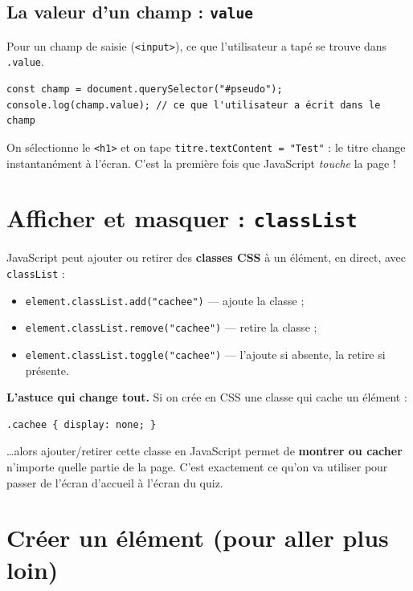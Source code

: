 \documentclass[11pt,a4paper]{article}
\newcommand{\code}[1]{\texttt{#1}}
\begin{document}
\subsection{La valeur d'un champ : \texttt{value}}
Pour un champ de saisie (\code{<input>}), ce que l'utilisateur a tapé se trouve dans \code{.value}.

\begin{lstlisting}[style=js]
const champ = document.querySelector("#pseudo");
console.log(champ.value); // ce que l'utilisateur a écrit dans le champ
\end{lstlisting}

\begin{infobox}
On sélectionne le \code{<h1>} et on tape \code{titre.textContent = "Test"} : le titre change instantanément à l'écran. C'est la première fois que JavaScript \emph{touche} la page !
\end{infobox}

\section{Afficher et masquer : \texttt{classList}}

JavaScript peut ajouter ou retirer des \textbf{classes CSS} à un élément, en direct, avec \code{classList} :
\begin{itemize}[leftmargin=*,noitemsep]
  \item \code{element.classList.add("cachee")} --- ajoute la classe ;
  \item \code{element.classList.remove("cachee")} --- retire la classe ;
  \item \code{element.classList.toggle("cachee")} --- l'ajoute si absente, la retire si présente.
\end{itemize}

\textbf{L'astuce qui change tout.} Si on crée en CSS une classe qui cache un élément :
\begin{lstlisting}[style=html]
.cachee { display: none; }
\end{lstlisting}
\ldots alors ajouter/retirer cette classe en JavaScript permet de \textbf{montrer ou cacher} n'importe quelle partie de la page. C'est exactement ce qu'on va utiliser pour passer de l'écran d'accueil à l'écran du quiz.

\section{Créer un élément (pour aller plus loin)}
\end{document}

